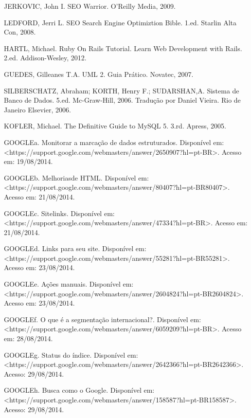\documentclass[
	12pt,				%
	openright,			%
	twoside,			%
	a4paper,			%
	english,			%
	french,				%
	spanish,			%
	brazil				%
	]{abntex2}
\begin{document}
\postextual

% 

JERKOVIC, John I. SEO Warrior. O'Reilly Media, 2009.

LEDFORD, Jerri L. SEO Search Engine Optimiztion Bible. 1.ed. Starlin Alta Con, 2008.

HARTL, Michael. Ruby On Rails Tutorial. Learn Web Development with Rails. 2.ed. Addison-Wesley, 2012.

GUEDES, Gilleanes T.A. UML 2. Guia Prático. Novatec, 2007.

SILBERSCHATZ, Abraham; KORTH, Henry F.; SUDARSHAN,A. Sistema de Banco de Dados. 5.ed. Mc-Graw-Hill, 2006. Tradução por Daniel Vieira. Rio de Janeiro Elsevier, 2006.

KOFLER, Michael. The Definitive Guide to MySQL 5. 3.rd. Apress, 2005.

GOOGLEa. Monitorar a marcação de dados estruturados. Disponível em: <https://support.google.com/webmasters/answer/2650907?hl=pt-BR>. Acesso  em: 19/08/2014.

GOOGLEb. Melhoriasde HTML. Disponível em: <https://support.google.com/webmasters/answer/80407?hl=pt-BR80407>. Acesso em: 21/08/2014.

GOOGLEc. Sitelinks. Disponível em: <https://support.google.com/webmasters/answer/47334?hl=pt-BR>. Acesso em: 21/08/2014.

GOOGLEd. Links para seu site. Disponível em: <https://support.google.com/webmasters/answer/55281?hl=pt-BR55281>. Acesso em: 23/08/2014.

GOOGLEe. Ações manuais. Disponível em: <https://support.google.com/webmasters/answer/2604824?hl=pt-BR2604824>. Acesso em: 23/08/2014.

GOOGLEf. O que é a segmentação internacional?. Disponível em: <https://support.google.com/webmasters/answer/6059209?hl=pt-BR>. Acesso em: 28/08/2014.

GOOGLEg. Status do índice. Disponível em: <https://support.google.com/webmasters/answer/2642366?hl=pt-BR2642366>. Acesso: 29/08/2014.

GOOGLEh. Busca como o Google. Disponível em: <https://support.google.com/webmasters/answer/158587?hl=pt-BR158587>. Acesso: 29/08/2014.
\end{document}

